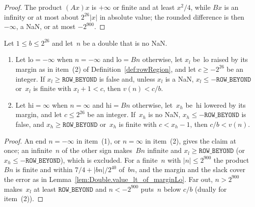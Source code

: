 \begin{proof}
  \leanok
  The product $(A x) x$ is $+\infty$ or finite and at least $x^2/4$, while $B x$ is an infinity or
  at most about $2^{26}|x|$ in absolute value; the rounded difference is then $-\infty$, a NaN, or
  at most $-2^{900}$.
\end{proof}

\begin{lemma}[The ends for $a = 0$]\label{lem:Double.lt_div_of_marginLo}
  \leanok
  Let $1 \le b \le 2^{26}$ and let~$n$ be a double that is no NaN.
  \begin{enumerate}
    \item Let $\mathrm{lo} = -\infty$ when $n = -\infty$ and $\mathrm{lo} = B n$ otherwise, let
      $x_l$ be~$\mathrm{lo}$ raised by its margin as in item~(2) of Definition~\ref{def:rowRegion},
      and let $c \ge -2^{26}$ be an integer. If $x_l \ge \mathtt{ROW\_BEYOND}$ is false and, unless
      $x_l$ is a NaN, $x_l \le -\mathtt{ROW\_BEYOND}$ or~$x_l$ is finite with $x_l + 1 < c$, then
      $v(n) < c/b$.
    \item Let $\mathrm{hi} = \infty$ when $n = \infty$ and $\mathrm{hi} = B n$ otherwise, let~$x_h$
      be~$\mathrm{hi}$ lowered by its margin, and let $c \le 2^{26}$ be an integer. If~$x_h$ is no
      NaN, $x_h \le -\mathtt{ROW\_BEYOND}$ is false, and $x_h \ge \mathtt{ROW\_BEYOND}$ or~$x_h$ is
      finite with $c < x_h - 1$, then $c/b < v(n)$.
  \end{enumerate}
\end{lemma}

\begin{proof}
  \leanok
  An end $n = -\infty$ in item~(1), or $n = \infty$ in item~(2), gives the claim at once; an
  infinite~$n$ of the other sign makes~$B n$ infinite and $x_l \ge \mathtt{ROW\_BEYOND}$ (or
  $x_h \le -\mathtt{ROW\_BEYOND}$), which is excluded. For a finite~$n$ with $|n| \le 2^{900}$ the product $B n$ is finite and within
  $7/4 + |bn|/2^{40}$ of~$bn$, and the margin and the slack cover the error as in
  Lemma~\ref{lem:Double.value_lt_of_marginLo}. Far out, $n > 2^{900}$ makes~$x_l$ at least
  $\mathtt{ROW\_BEYOND}$ and $n < -2^{900}$ puts~$n$ below $c/b$ (dually for item~(2)).
\end{proof}

